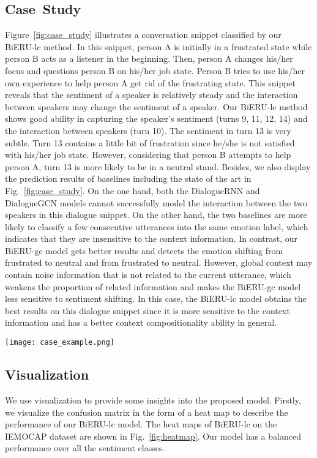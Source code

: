 \documentclass[journal]{IEEEtran}
\begin{document}
\subsection{Case~Study}
Figure~\ref{fig:case_study} illustrates a conversation snippet classified by our BiERU-lc method. In this snippet, person A is initially in a frustrated state while person B acts as a listener in the beginning. Then, person A changes his/her focus and questions person B on his/her job state. Person B tries to use his/her own experience to help person A get rid of the frustrating state. This snippet reveals that the sentiment of a speaker is relatively steady and the interaction between speakers may change the sentiment of a speaker. Our BiERU-lc method shows good ability in capturing the speaker's sentiment (turns 9, 11, 12, 14) and the interaction between speakers (turn 10). The sentiment in turn 13 is very subtle. Turn 13 contains a little bit of frustration since he/she is not satisfied with his/her job state. However, considering that person B attempts to help person A, turn 13 is more likely to be in a neutral stand. Besides, we also display the prediction results of baselines including the state of the art in Fig.~\ref{fig:case_study}. On the one hand, both the DialogueRNN and DialogueGCN models cannot successfully model the interaction between the two speakers in this dialogue snippet. On the other hand, the two baselines are more likely to classify a few consecutive utterances into the same emotion label, which indicates that they are insensitive to the context information. In contrast, our BiERU-gc model gets better results and detects the emotion shifting from frustrated to neutral and from frustrated to neutral. However, global context may contain noise information that is not related to the current utterance, which weakens the proportion of related information and makes the BiERU-gc model less sensitive to sentiment shifting. In this case, the BiERU-lc model obtains the best results on this dialogue snippet since it is more sensitive to the context information and has a better context compositionality ability in general.

\begin{figure*}[!ht]
    \centering
	\texttt{[image: case\_example.png]}
	\linespread{1}
\caption{Illustration of a conversation snippet from IEMOCAP dataset.}
\label{fig:case_study}
\end{figure*}{}




\subsection{Visualization}
We use visualization to provide some insights into the proposed model. Firstly, we visualize the confusion matrix in the form of a heat map to describe the performance of our BiERU-lc model. The heat maps of BiERU-lc on the IEMOCAP dataset are shown in Fig.~\ref{fig:heatmap}.
Our model has a balanced performance over all the sentiment classes.
\end{document}
